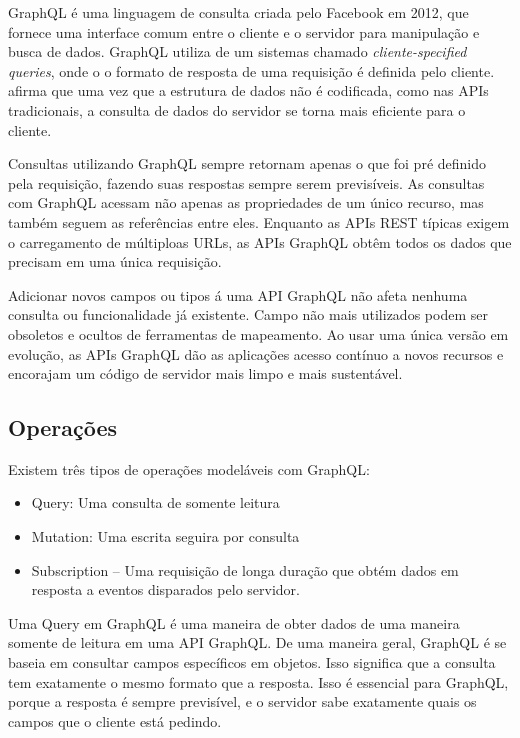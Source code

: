 GraphQL é uma linguagem de consulta criada pelo Facebook em 2012, que fornece uma interface comum entre o cliente e o servidor para manipulação e busca de dados. GraphQL utiliza de um sistemas chamado \textit{cliente-specified queries}, onde o o formato de resposta de uma requisição é definida pelo cliente.  afirma que uma vez que a estrutura de dados não é codificada, como nas APIs tradicionais, a consulta de dados do servidor se torna mais eficiente para o cliente.

Consultas utilizando GraphQL sempre retornam apenas o que foi pré definido pela requisição, fazendo suas respostas sempre serem previsíveis. As consultas com GraphQL acessam não apenas as propriedades de um único recurso, mas também seguem as referências entre eles. Enquanto as APIs REST típicas exigem o carregamento de múltiploas URLs, as APIs GraphQL obtêm todos os dados que precisam em uma única requisição.

Adicionar novos campos ou tipos á uma API GraphQL não afeta nenhuma consulta ou funcionalidade já existente. Campo não mais utilizados podem ser obsoletos e ocultos de ferramentas de mapeamento. Ao usar uma única versão em evolução, as APIs GraphQL dão as aplicações acesso contínuo a novos recursos e encorajam um código de servidor mais limpo e mais sustentável.

\subsection{Operações}

Existem três tipos de operações modeláveis com GraphQL:

\begin{itemize}
\item Query: Uma consulta de somente leitura
\item Mutation: Uma escrita seguira por consulta
\item Subscription – Uma requisição de longa duração que obtém dados em resposta a eventos disparados pelo servidor.
\end{itemize}

Uma Query em GraphQL é uma maneira de obter dados de uma maneira somente de leitura em uma API GraphQL. De uma maneira geral, GraphQL é se baseia em consultar campos específicos em objetos. Isso significa que a consulta tem exatamente o mesmo formato que a resposta. Isso é essencial para GraphQL, porque a resposta é sempre previsível, e o servidor sabe exatamente quais os campos que o cliente está pedindo.

